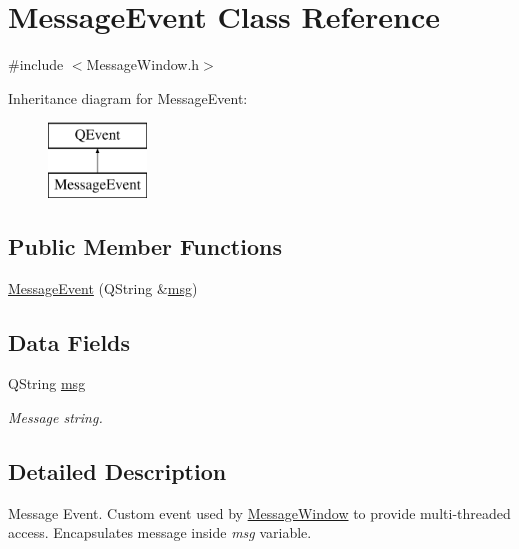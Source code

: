 \hypertarget{class_message_event}{}\section{Message\+Event Class Reference}
\label{class_message_event}


{\ttfamily \#include $<$Message\+Window.\+h$>$}

Inheritance diagram for Message\+Event\+:\begin{figure}[H]
\begin{center}
\leavevmode
\includegraphics[height=2.000000cm]{class_message_event}
\end{center}
\end{figure}
\subsection*{Public Member Functions}
\begin{DoxyCompactItemize}
\item 
\mbox{\hyperlink{class_message_event_a19d713493077b51a9e802895d7389b86}{Message\+Event}} (Q\+String \&\mbox{\hyperlink{class_message_event_a7eaf039e27259097d5cf0d8b07ab1d96}{msg}})
\end{DoxyCompactItemize}
\subsection*{Data Fields}
\begin{DoxyCompactItemize}
\item 
\mbox{\label{class_message_event_a7eaf039e27259097d5cf0d8b07ab1d96}} 
Q\+String \mbox{\hyperlink{class_message_event_a7eaf039e27259097d5cf0d8b07ab1d96}{msg}}
\begin{DoxyCompactList}\small\item\em Message string. \end{DoxyCompactList}\end{DoxyCompactItemize}


\subsection{Detailed Description}
Message Event. Custom event used by \mbox{\hyperlink{class_message_window}{Message\+Window}} to provide multi-\/threaded access. Encapsulates message inside {\itshape msg} variable. 

